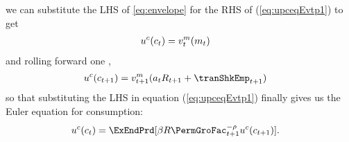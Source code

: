 we can substitute the LHS of \eqref{eq:envelope} for the RHS of
(\ref{eq:upceqEvtp1}) to get
  \begin{equation}\begin{gathered}\begin{aligned}
        u^{c}(c_{t})  & = {v}^{m}_{t}(m_{t})\label{eq:upcteqvtp}
      \end{aligned}\end{gathered}\end{equation}
and rolling forward one {\interval},
\begin{equation}\begin{gathered}\begin{aligned}
      \uFunc^{\cNrm}(\cNrm_{\prd+1})  & = \vFunc^{\mNrm}_{\prd+1}({a}_{\prd}\RNrm_{\prd+1}+\tranShkEmp_{\prd+1}) \label{eq:upctp1EqVpxtp1}
    \end{aligned}\end{gathered}\end{equation}
so that substituting the LHS in equation (\ref{eq:upceqEvtp1}) finally gives us the Euler equation for consumption:
  \begin{equation}\begin{gathered}\begin{aligned}
        \uFunc^{\cNrm}(\cNrm_{\prd})  & = \ExEndPrd[\DiscFac \Rfree \PermGroFac_{\prd+1}^{-\CRRA}\uFunc^{\cNrm}(\cNrm_{\prd+1})] \label{eq:cEuler}.
      \end{aligned}\end{gathered}\end{equation}


